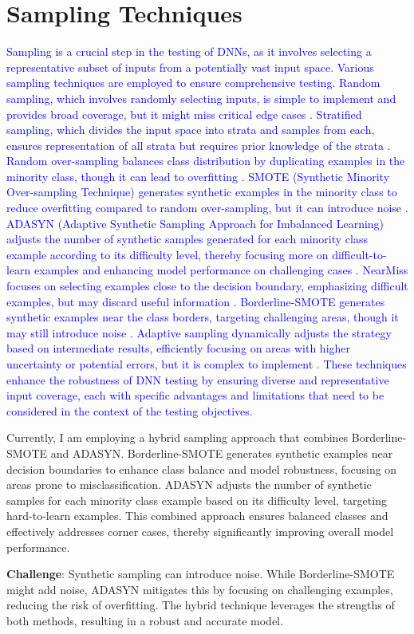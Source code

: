 \section{Sampling Techniques}
\textcolor{blue}{
Sampling is a crucial step in the testing of DNNs, as it involves selecting a representative subset of inputs from a potentially vast input space. Various sampling techniques are employed to ensure comprehensive testing. Random sampling, which involves randomly selecting inputs, is simple to implement and provides broad coverage, but it might miss critical edge cases \cite{Frey1997}. Stratified sampling, which divides the input space into strata and samples from each, ensures representation of all strata but requires prior knowledge of the strata \cite{Katz2017}. Random over-sampling balances class distribution by duplicating examples in the minority class, though it can lead to overfitting \cite{Chawla2002}. SMOTE (Synthetic Minority Over-sampling Technique) generates synthetic examples in the minority class to reduce overfitting compared to random over-sampling, but it can introduce noise \cite{Chawla2002}. ADASYN (Adaptive Synthetic Sampling Approach for Imbalanced Learning) adjusts the number of synthetic samples generated for each minority class example according to its difficulty level, thereby focusing more on difficult-to-learn examples and enhancing model performance on challenging cases \cite{He2008}. NearMiss focuses on selecting examples close to the decision boundary, emphasizing difficult examples, but may discard useful information \cite{Mani2003}. Borderline-SMOTE generates synthetic examples near the class borders, targeting challenging areas, though it may still introduce noise \cite{Han2005}. Adaptive sampling dynamically adjusts the strategy based on intermediate results, efficiently focusing on areas with higher uncertainty or potential errors, but it is complex to implement \cite{Roth2019}. These techniques enhance the robustness of DNN testing by ensuring diverse and representative input coverage, each with specific advantages and limitations that need to be considered in the context of the testing objectives.
}
\begin{tcolorbox}[colback=purple!2!white, colframe=purple]

  Currently, I am employing a hybrid sampling approach that combines Borderline-SMOTE and ADASYN. Borderline-SMOTE generates synthetic examples near decision boundaries to enhance class balance and model robustness, focusing on areas prone to misclassification. ADASYN adjusts the number of synthetic samples for each minority class example based on its difficulty level, targeting hard-to-learn examples. This combined approach ensures balanced classes and effectively addresses corner cases, thereby significantly improving overall model performance.
  
  \textbf{Challenge}: Synthetic sampling can introduce noise. While Borderline-SMOTE might add noise, ADASYN mitigates this by focusing on challenging examples, reducing the risk of overfitting. The hybrid technique leverages the strengths of both methods, resulting in a robust and accurate model.
  
  \end{tcolorbox}

